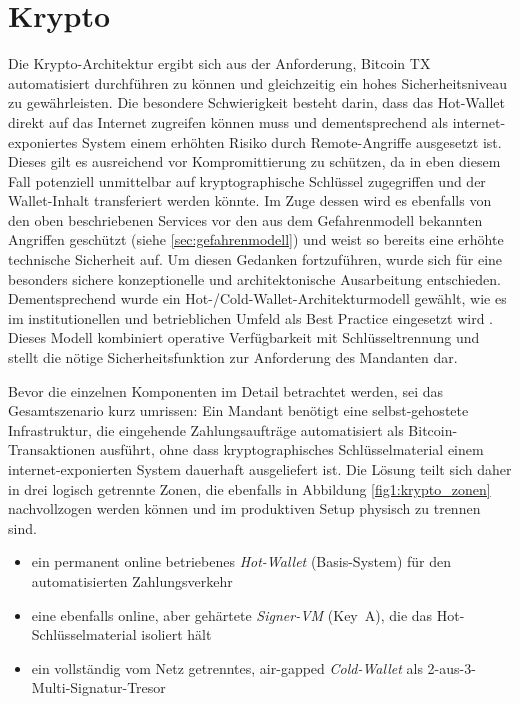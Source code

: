 \section{Krypto}
\label{Krypto}
Die Krypto-Architektur ergibt sich aus der Anforderung, Bitcoin \ac{TX} automatisiert durchführen zu können und gleichzeitig ein hohes Sicherheitsniveau zu gewährleisten.
Die besondere Schwierigkeit besteht darin, dass das Hot-Wallet direkt auf das Internet zugreifen können muss und dementsprechend als internet-exponiertes System einem erhöhten Risiko durch Remote-Angriffe ausgesetzt ist.
Dieses gilt es ausreichend vor Kompromittierung zu schützen, da in eben diesem Fall potenziell unmittelbar auf kryptographische Schlüssel zugegriffen und der Wallet-Inhalt transferiert werden könnte.
Im Zuge dessen wird es ebenfalls von den oben beschriebenen Services vor den aus dem Gefahrenmodell bekannten Angriffen geschützt (siehe \ref{sec:gefahrenmodell}) und weist so bereits eine erhöhte technische Sicherheit auf.
Um diesen Gedanken fortzuführen, wurde sich für eine besonders sichere konzeptionelle und architektonische Ausarbeitung entschieden. Dementsprechend wurde ein Hot-/Cold-Wallet-Architekturmodell gewählt, wie es im institutionellen und betrieblichen Umfeld als Best Practice eingesetzt wird \cite{knowingbitcoin_hotcold,nadcab_custodial_arch,riskpublishing_hotcold}. Dieses Modell kombiniert operative Verfügbarkeit mit Schlüsseltrennung und stellt die nötige Sicherheitsfunktion zur Anforderung des Mandanten dar.

Bevor die einzelnen Komponenten im Detail betrachtet werden, sei das Gesamtszenario kurz umrissen: Ein Mandant benötigt eine selbst-gehostete Infrastruktur, die eingehende Zahlungsaufträge automatisiert als Bitcoin-Transaktionen ausführt, ohne dass kryptographisches Schlüsselmaterial einem internet-exponierten System dauerhaft ausgeliefert ist. Die Lösung teilt sich daher in drei logisch getrennte Zonen, die ebenfalls in Abbildung \ref{fig1:krypto_zonen} nachvollzogen werden können und im produktiven Setup physisch zu trennen sind.
\begin{itemize}
    \item ein permanent online betriebenes \emph{Hot-Wallet} (Basis-System) für den automatisierten Zahlungsverkehr
    \item eine ebenfalls online, aber gehärtete \emph{Signer-\ac{VM}} (Key~A), die das Hot-Schlüsselmaterial isoliert hält
    \item ein vollständig vom Netz getrenntes, air-gapped \emph{Cold-Wallet}  als 2-aus-3-Multi-Signatur-Tresor
\end{itemize}


